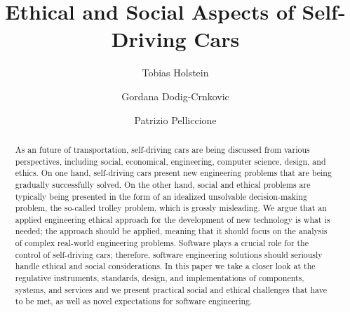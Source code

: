 \documentclass[sigconf,review, anonymous]{acmart}
\newcommand{\ugh}[1]{\textcolor{red}{\uwave{#1}}} %
\begin{document}
\title{Ethical and Social Aspects of Self-Driving Cars}




\author{Tobias Holstein}

\author{Gordana Dodig-Crnkovic}


\author{Patrizio Pelliccione}



\renewcommand{\shortauthors}{T. Holstein et al.}



\begin{acronym}
\end{acronym}





\begin{abstract}
As an \ugh{envisiged} future of transportation, self-driving cars are being discussed from various perspectives, including social, economical, engineering, computer science, design, and ethics. On one hand, self-driving cars present new engineering problems that are being gradually successfully solved. On the other hand, social and ethical problems are typically being presented in the form of an idealized unsolvable decision-making problem, the so-called trolley problem, which is grossly misleading. We argue that an applied engineering ethical approach for the development of new technology is what is needed; the approach should be applied, meaning that it should focus on the analysis of complex real-world engineering problems. Software plays a crucial role for the control of self-driving cars; therefore, software engineering  solutions should seriously handle ethical and social considerations. 
In this paper we take a closer look at the regulative instruments, standards, design, and implementations of components, systems, and services and we present practical social and ethical challenges that have to be met, as well as novel expectations for software engineering.
\end{abstract}
\end{document}
